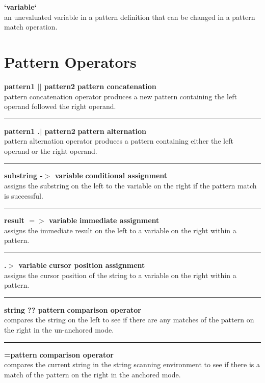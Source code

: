 \documentclass[letterpaper,12pt]{article}
\begin{document}
{\noindent\textbf{`variable`} \\
an unevaluated variable in a pattern definition that can be changed in a pattern match operation.\\

\section*{Pattern Operators}
\noindent\textbf{pattern1 $\vert\vert$	pattern2} \hfill \textbf{pattern concatenation}\\
pattern concatenation operator produces a new pattern containing the left operand followed the right operand.\\
\noindent\rule{16.5cm}{0.4pt}

\noindent\textbf{pattern1 .$\vert$ pattern2} \hfill \textbf{pattern alternation}\\
pattern alternation operator produces a pattern containing either the left operand or the right operand.\\
\noindent\rule{16.5cm}{0.1pt}

\noindent\textbf{substring -$>$ variable} \hfill\textbf{conditional assignment}\\
assigns the substring on the left to the variable on the right if the pattern match is successful.\\
\noindent\rule{16.5cm}{0.1pt}

\noindent\textbf{result $=>$ variable} \hfill\textbf{immediate assignment}\\
assigns the immediate result on the left to a variable on the right within a pattern.\\
\noindent\rule{16.5cm}{0.1pt}

\noindent\textbf{.$>$ variable} \hfill\textbf{cursor position assignment}\\
assigns the cursor position of the string to a variable on the right within a pattern.\\
\noindent\rule{16.5cm}{0.1pt}

\noindent\textbf{string ?? pattern} \hfill\textbf{comparison operator}\\
compares the string on the left to see if there are any matches of the pattern on the right in the un-anchored mode.\\
\noindent\rule{16.5cm}{0.1pt}

\noindent\textbf{=pattern} \hfill\textbf{comparison operator}\\
compares the current string in the string scanning environment to see if there is a match of the pattern on the right in the anchored mode.\\

}
\end{document}
